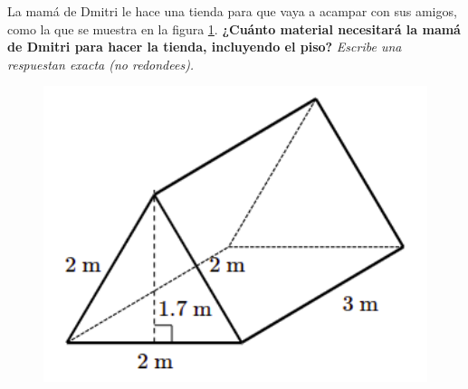 \question[10] La mamá de Dmitri le hace una tienda para que vaya a acampar con sus amigos,
como la que se muestra en la figura \ref{fig:prob_verb_superficie_03}.
\textbf{¿Cuánto material necesitará la mamá de Dmitri para hacer la tienda, incluyendo el piso?}
\textit{Escribe una respuestan exacta (no redondees).}

\begin{minipage}{0.3\linewidth}
    \begin{figure}[H]
        \begin{center}
            \includegraphics[width=1\textwidth]{../images/prob_verb_superficie_03}
        \end{center}
        \caption{}
        \label{fig:prob_verb_superficie_03}
    \end{figure}
\end{minipage}
\begin{minipage}{0.7\linewidth}
\end{minipage}